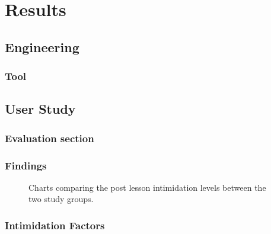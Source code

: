 \chapter{Results}
\label{chap:results}


\section{Engineering}

\subsection{Tool}

\section{User Study}

\subsection{Evaluation section}


\FloatBarrier %

\subsection{Findings}

\begin{figure}[htbp]
	\centering
	\scalebox{0.67}{}
	\vspace{-2em}
	\caption{Charts comparing the post lesson intimidation levels between the two study groups.}
	\label{fig:confidence}
\end{figure}

\subsection{Intimidation Factors}
